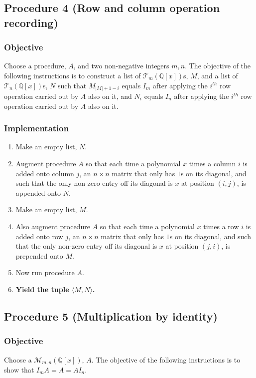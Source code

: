 \documentclass[twocolumn]{article}
\begin{document}
		\subsection{Procedure 4 (Row and column operation recording)}\label{sec:procedure 4}
			\subsubsection{Objective}
				Choose a procedure, $A$, and two non-negative integers $m,n$. The objective of the following instructions is to construct a list of $\mathcal{T}_{m}(\mathbb{Q}[x])$s, $M$, and a list of $\mathcal{T}_{n}(\mathbb{Q}[x])$s, $N$ such that $M_{\lvert M\rvert +1-i}$ equals $I_m$ after applying the $i^{th}$ row operation carried out by $A$ also on it, and $N_i$ equals $I_n$ after applying the $i^{th}$ row operation carried out by $A$ also on it.
			\subsubsection{Implementation}
				\begin{enumerate}
					\item Make an empty list, $N$.
					\item Augment procedure $A$ so that each time a polynomial $x$ times a column $i$ is added onto column $j$, an $n\times n$ matrix that only has $1$s on its diagonal, and such that the only non-zero entry off its diagonal is $x$ at position $(i,j)$, is appended onto $N$.
					\item Make an empty list, $M$.
					\item Also augment procedure $A$ so that each time a polynomial $x$ times a row $i$ is added onto row $j$, an $n\times n$ matrix that only has $1$s on its diagonal, and such that the only non-zero entry off its diagonal is $x$ at position $(j,i)$, is prepended onto $M$.
					\item Now run procedure $A$.
					\item \textbf{Yield the tuple $\langle M,N\rangle$.}
				\end{enumerate}
		\subsection{Procedure 5 (Multiplication by identity)}\label{sec:procedure 5}
			\subsubsection{Objective}
				Choose a $\mathcal{M}_{m,n}(\mathbb{Q}[x])$, $A$. The objective of the following instructions is to show that $I_mA=A=AI_n$.
\end{document}
